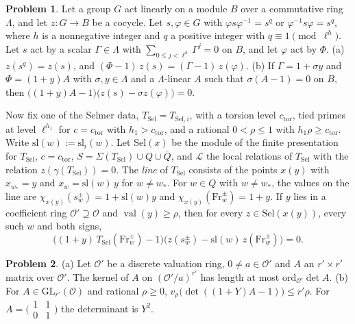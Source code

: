 \documentclass[reqno]{amsart}
\theoremstyle{definition}
\newtheorem{problem}{Problem}[section]
\theoremstyle{plain}
\newcommand{\Sel}{\mathrm{Sel}}
\newcommand{\val}{\operatorname{val}}
\newcommand{\ord}{\mathrm{ord}}
\newcommand{\Oc}{\mathcal{O}}
\newcommand{\TS}{T_{\mathrm{Sel}}}
\newcommand{\ctor}{c_{\mathrm{tor}}}
\newcommand{\Fr}{\mathrm{Fr}}
\newcommand{\sla}{\mathrm{sl}}
\newcommand{\Ti}{T_{\mathrm{Sel},i}}
\begin{document}
\begin{problem}\label{pr:line}
Let a group \(G\) act linearly on a module \(B\) over a commutative ring \(\Lambda\), and let \(z \colon G \to B\) be a cocycle.  Let \(s, \varphi \in G\) with \(\varphi s \varphi^{-1} = s^{q}\) or \(\varphi^{-1} s \varphi = s^{q}\), where \(h\) is a nonnegative integer and \(q\) a positive integer with \(q \equiv 1 \pmod{\ell^{h}}\).  Let \(s\) act by a scalar \(\Gamma \in \Lambda\) with \(\sum_{0 \le j < \ell^{h}} \Gamma^j = 0\) on \(B\), and let \(\varphi\) act by \(\Phi\).
\textup{(a)} \(z(s^{q}) = z(s)\), and \((\Phi - 1)\,z(s) = (\Gamma - 1)\,z(\varphi)\).
\textup{(b)} If \(\Gamma = 1 + \sigma y\) and \(\Phi = (1 + y)A\) with \(\sigma, y \in \Lambda\) and a \(\Lambda\)-linear \(A\) such that \(\sigma(A - 1) = 0\) on \(B\), then \(\bigl((1 + y)A - 1\bigr)\bigl(z(s) - \sigma z(\varphi)\bigr) = 0\).
\end{problem}

Now fix one of the Selmer data, \(\TS = \Ti\), with a torsion level \(\ctor\), tied primes at level \(\ell^{h_1}\) for \(c = \ctor\) with \(h_1 > \ctor\), and a rational \(0 < \rho \le 1\) with \(h_1\rho \ge \ctor\).  Write \(\sla(w) := \sla_i(w)\).  Let \(\Sel(x)\) be the module of the finite presentation for \(\TS\), \(c = \ctor\), \(S = \Sigma(\TS) \cup Q \cup \bar Q\), and \(\mathcal L\) the local relations of \(\TS\) with the relation \(z(\gamma(\TS)) = 0\).  The \emph{line} of \(\TS\) consists of the points \(x(y)\) with \(x_{w_*} = y\) and \(x_w = \sla(w)\,y\) for \(w \ne w_*\).  For \(w \in Q\) with \(w \ne w_*\), the values on the line are \(\chi_{x(y)}(s_w^{\pm}) = 1 + \sla(w)y\) and \(\chi_{x(y)}(\Fr_w^{\pm}) = 1 + y\).  If \(y\) lies in a coefficient ring \(\Oc' \supseteq \Oc\) and \(\val(y) \ge \rho\), then for every \(z \in \Sel(x(y))\), every such \(w\) and both signs,
\begin{equation}\label{eq:untie}
  \bigl((1 + y)\,\TS(\Fr_w^{\pm}) - 1\bigr)\bigl(z(s_w^{\pm}) - \sla(w)\, z(\Fr_w^{\pm})\bigr) = 0 .
\end{equation}

\begin{problem}\label{pr:det-gauss}
\textup{(a)} Let \(\Oc'\) be a discrete valuation ring, \(0 \ne a \in \Oc'\) and \(A\) an \(r' \times r'\) matrix over \(\Oc'\).  The kernel of \(A\) on \((\Oc'/a)^{r'}\) has length at most \(\ord_{\Oc'}\det A\).
\textup{(b)} For \(A \in \mathrm{GL}_{r'}(\Oc)\) and rational \(\rho \ge 0\), \(v_\rho\bigl(\det((1 + Y)A - 1)\bigr) \le r'\rho\).  For \(A = \bigl(\begin{smallmatrix} 1 & 1 \\ 0 & 1 \end{smallmatrix}\bigr)\) the determinant is \(Y^2\).
\end{problem}
\end{document}
